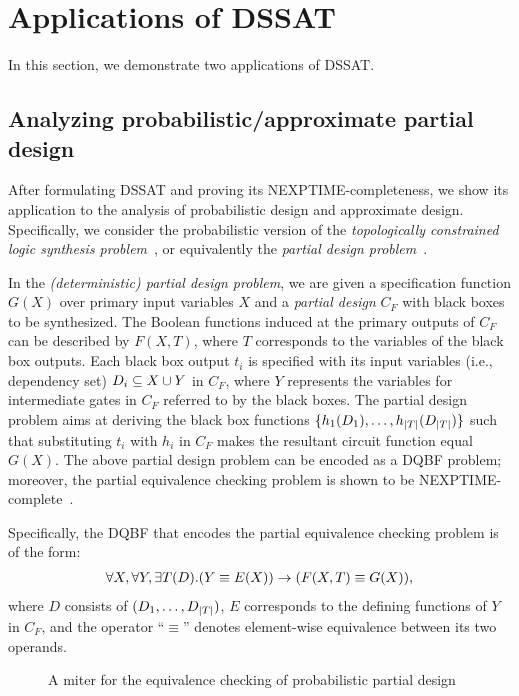 \section{Applications of DSSAT}
\label{sect:dssat-application}

In this section, we demonstrate two applications of DSSAT.

\subsection{Analyzing probabilistic/approximate partial design}
After formulating DSSAT and proving its NEXPTIME-completeness,
we show its application to the analysis of probabilistic design and approximate design.
Specifically, we consider the probabilistic version of the \textit{topologically constrained logic synthesis problem}~\cite{Sinha2002,Balabanov2014},
or equivalently the \textit{partial design problem}~\cite{Gitina2013}.

In the \textit{(deterministic) partial design problem},
we are given a specification function $G(X)$ over primary input variables $X$ and
a \textit{partial design} $C_F$ with black boxes to be synthesized.
The Boolean functions induced at the primary outputs of $C_F$ can be described by $F(X,T)$,
where $T$ corresponds to the variables of the black box outputs.
Each black box output $t_i$ is specified with its input variables (i.e., dependency set) $D_{i}\subseteq X \cup Y$ in $C_F$,
where $Y$ represents the variables for intermediate gates in $C_F$ referred to by the black boxes.
The partial design problem aims at deriving the black box functions $\{h_1(D_{1}),\ldots,h_{|T|}(D_{|T|})\}$
such that substituting $t_i$ with $h_i$ in $C_F$ makes the resultant circuit function equal $G(X)$.
The above partial design problem can be encoded as a DQBF problem;
moreover, the partial equivalence checking problem is shown to be NEXPTIME-complete~\cite{Gitina2013}.

Specifically, the DQBF that encodes the partial equivalence checking problem is of the form:
\begin{align}
    \label{eq:dssat-dqbf-partial-design}
    \forall X,\forall Y,\exists T(D).(Y \equiv E(X)) \rightarrow (F(X,T)\equiv G(X)),
\end{align}
where $D$ consists of $(D_{1},\ldots,D_{|T|})$,
$E$ corresponds to the defining functions of $Y$ in $C_F$,
and the operator ``$\equiv$'' denotes element-wise equivalence between its two operands.

\begin{figure}[t]
    \centering
    
    \caption{A miter for the equivalence checking of probabilistic partial design}
    \label{fig:dssat-prob-miter}
\end{figure}

